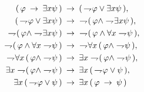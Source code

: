 	\begin{sketch}
		\begin{align}
			(\, \varphi \rarrow \exists x \psi\, ) &\rarrow 
				(\, \negation \varphi \vee \exists x \psi\, ), \\
			(\, \negation \varphi \vee \exists x \psi\, ) &\rarrow
				\ \negation (\, \varphi \wedge \negation \exists x \psi\, ), \\
			\negation (\, \varphi \wedge \negation \exists x \psi\, ) &\rarrow 
				\ \negation (\, \varphi \wedge \forall x \negation \psi\, ), \\
			\negation (\, \varphi \wedge \forall x \negation \psi\, ) &\rarrow 
				\ \negation \forall x\, (\, \varphi \wedge \negation \psi\, ), \\
			\negation \forall x\, (\, \varphi \wedge \negation \psi\, ) &\rarrow 
				\exists x \negation (\, \varphi \wedge \negation \psi\, ), \\
			\exists x \negation (\, \varphi \wedge \negation \psi\, ) &\rarrow 
				\exists x\, (\, \negation \varphi \vee \psi\, ), \\
			\exists x\, (\, \negation \varphi \vee \psi\, ) &\rarrow 
				\exists x\, (\, \varphi \rarrow \psi\, )
		\end{align}
	\end{sketch}
	